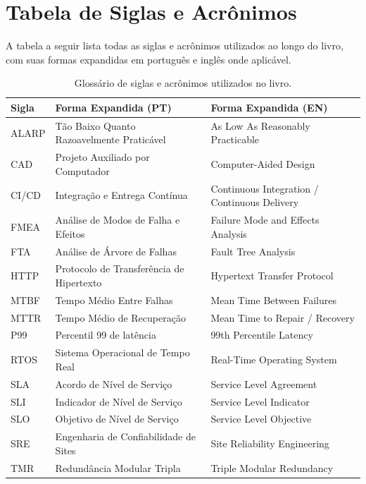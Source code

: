 \documentclass[12pt,a4paper]{report}
\begin{document}

\chapter{Tabela de Siglas e Acrônimos}

A tabela a seguir lista todas as siglas e acrônimos utilizados ao longo do livro, com suas formas expandidas em português e inglês onde aplicável.

\begin{table}[ht]
    \centering
    \renewcommand{\arraystretch}{1.4}
    \begin{tabular}{lp{5cm}p{6.5cm}}
        \toprule
        \textbf{Sigla} & \textbf{Forma Expandida (PT)} & \textbf{Forma Expandida (EN)} \\
        \midrule
        ALARP  & Tão Baixo Quanto Razoavelmente Praticável & As Low As Reasonably Practicable \\
        CAD    & Projeto Auxiliado por Computador          & Computer-Aided Design \\
        CI/CD  & Integração e Entrega Contínua             & Continuous Integration / Continuous Delivery \\
        FMEA   & Análise de Modos de Falha e Efeitos       & Failure Mode and Effects Analysis \\
        FTA    & Análise de Árvore de Falhas               & Fault Tree Analysis \\
        HTTP   & Protocolo de Transferência de Hipertexto  & Hypertext Transfer Protocol \\
        MTBF   & Tempo Médio Entre Falhas                  & Mean Time Between Failures \\
        MTTR   & Tempo Médio de Recuperação                & Mean Time to Repair / Recovery \\
        P99    & Percentil 99 de latência                  & 99th Percentile Latency \\
        RTOS   & Sistema Operacional de Tempo Real          & Real-Time Operating System \\
        SLA    & Acordo de Nível de Serviço                & Service Level Agreement \\
        SLI    & Indicador de Nível de Serviço             & Service Level Indicator \\
        SLO    & Objetivo de Nível de Serviço              & Service Level Objective \\
        SRE    & Engenharia de Confiabilidade de Sites      & Site Reliability Engineering \\
        TMR    & Redundância Modular Tripla                & Triple Modular Redundancy \\
        \bottomrule
    \end{tabular}
    \caption{Glossário de siglas e acrônimos utilizados no livro.}
\end{table}
\end{document}
